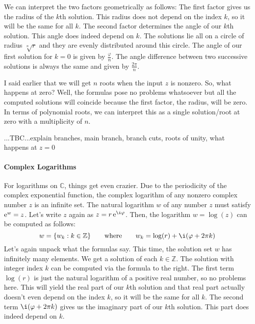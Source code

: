 \medskip
We can interpret the two factors geometrically as follows: The first factor gives us the radius of the $k$th solution. This radius does not depend on the index $k$, so it will be the same for all $k$. The second factor determines the angle of our $k$th solution. This angle does indeed depend on $k$. The solutions lie all on a circle of radius $\sqrt[n]{r}$ and they are evenly distributed around this circle. The angle of our first solution for $k=0$ is given by $\frac{\varphi}{n}$. The angle difference between two successive solutions is always the same and given by $\frac{2 \pi}{n}$. 

\medskip
I said earlier that we will get $n$ roots when the input $z$ is nonzero. So, what happens at zero? Well, the formulas pose no problems whatsoever but all the computed solutions will coincide because the first factor, the radius, will be zero. In terms of polynomial roots, we can interpret this as a single solution/root at zero with a multiplicity of $n$.


 ...TBC...explain branches, main branch, branch cuts, roots of unity, what happens at $z=0$


\paragraph{Complex Logarithms}
For logarithms on $\mathbb{C}$, things get even crazier. Due to the periodicity of the complex exponential function, the complex logarithm of any nonzero complex number $z$ is an infinite set. The natural logarithm $w$ of any number $z$ must satisfy $\operatorname{\mathrm{e}}^w = z$. Let's write $z$ again as $z = r \e^{\i \varphi}$. Then, the logarithm $w = \log(z)$ can be computed as follows:
\begin{equation}
 \label{Eq:ComplexLogarithm}
 w = \{ w_k : k \in \mathbb{Z}  \}
 \qquad \text{where} \qquad
 w_k = \log(r) + \i (\varphi + 2 \pi k)
\end{equation}
Let's again unpack what the formulas say. This time, the solution set $w$ has infinitely many elements. We get a solution of each $k \in \mathbb{Z}$. The solution with integer index $k$ can be computed via the formula to the right. The first term $\log(r)$ is just the natural logarithm of a positive real number, so no problems here. This will yield the real part of our $k$th solution and that real part actually doesn't even depend on the index $k$, so it will be the same for all $k$. The second term $\i (\varphi + 2 \pi k)$ gives us the imaginary part of our $k$th solution. This part does indeed depend on $k$. 

